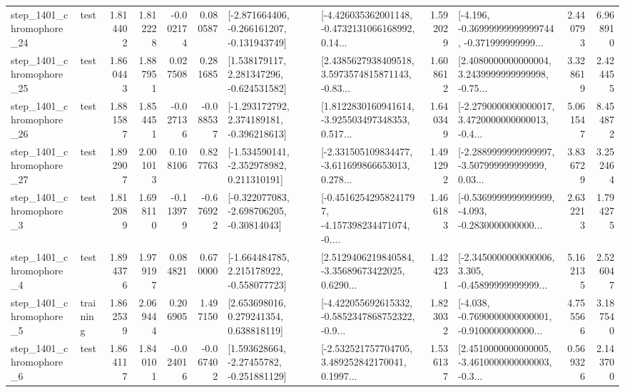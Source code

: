 \begin{tabular}{llrrrrllrlrr}
 step\_1401\_chromophore\_24 &      test &      1.814402 &    1.812228 &     -0.002174 &  0.080587 &  [-2.871664406, -0.266161207, -0.131943749] &  [-4.426035362001148, -0.4732131066168992, 0.14... &       1.592029 &  [-4.196, -0.36999999999999744, -0.371999999999... &            2.440793 &          6.968910 \\
 step\_1401\_chromophore\_25 &      test &      1.860443 &    1.887951 &      0.027508 &  0.281685 &    [1.538179117, 2.281347296, -0.624531582] &  [2.4385627938409518, 3.5973574815871143, -0.83... &       1.608612 &  [2.4080000000000004, 3.2439999999999998, -0.75... &            3.328619 &          2.424455 \\
 step\_1401\_chromophore\_26 &      test &      1.881587 &    1.854451 &     -0.027136 & -0.088537 &   [-1.293172792, 2.374189181, -0.396218613] &  [1.8122830160941614, -3.925503497348353, 0.517... &       1.640349 &  [-2.2790000000000017, 3.4720000000000013, -0.4... &            5.061547 &          8.454872 \\
 step\_1401\_chromophore\_27 &      test &      1.892907 &    2.001013 &      0.108106 &  0.827763 &   [-1.534590141, -2.352978982, 0.211310191] &  [-2.331505109834477, -3.611699866653013, 0.278... &       1.491292 &  [-2.2889999999999997, -3.507999999999999, 0.03... &            3.836729 &          3.252464 \\
  step\_1401\_chromophore\_3 &      test &      1.812089 &    1.698110 &     -0.113979 & -0.676922 &   [-0.322077083, -2.698706205, -0.30814043] &  [-0.45162542958241797, -4.157398234471074, -0.... &       1.466183 &  [-0.5369999999999999, -4.093, -0.2830000000000... &            2.632213 &          1.794275 \\
  step\_1401\_chromophore\_4 &      test &      1.894376 &    1.979197 &      0.084821 &  0.670000 &   [-1.664484785, 2.215178922, -0.558077723] &  [2.5129406219840584, -3.35689673422025, 0.6290... &       1.424231 &  [-2.3450000000000006, 3.305, -0.45899999999999... &            5.162135 &          2.526047 \\
  step\_1401\_chromophore\_5 &  training &      1.862539 &    2.069444 &      0.206905 &  1.497150 &     [2.653698016, 0.279241354, 0.638818119] &  [-4.422055692615332, -0.5852347868752322, -0.9... &       1.823032 &  [-4.038, -0.7690000000000001, -0.9100000000000... &            4.755566 &          3.187540 \\
  step\_1401\_chromophore\_6 &      test &      1.864117 &    1.840101 &     -0.024016 & -0.067402 &    [1.593628664, -2.27455782, -0.251881129] &  [-2.532521757704705, 3.489252842170041, 0.1997... &       1.536137 &  [2.4510000000000005, -3.4610000000000003, -0.3... &            0.569326 &          2.143700 \\

\end{tabular}
